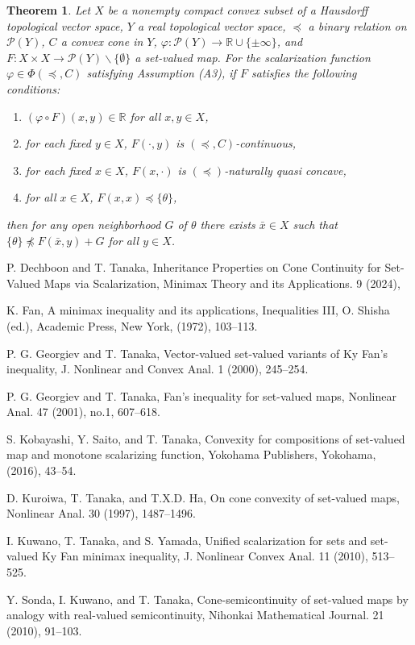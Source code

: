 \documentclass[a4paper,11pt]{jsarticle}
\newtheorem{thm}{Theorem}[section]
\theoremstyle{definition}
\newcommand{\RealNumberSet}{\mathbb{R}}
\begin{document}
\begin{thm}
  Let $X$ be a nonempty compact convex subset of a Hausdorff topological vector space,
  $Y$ a real topological vector space, $\preccurlyeq$ a binary relation on $\mathcal{P}(Y)$,
  $C$ a convex cone in $Y$, $\varphi\colon \mathcal{P}(Y) \to \RealNumberSet \cup \{\pm \infty\}$,
  and $F\colon X \times X \to \mathcal{P}(Y) \backslash \{\emptyset\}$ a set-valued map.
  For the scalarization function $\varphi \in \Phi(\preccurlyeq, C)$ satisfying Assumption (A3),
  if $F$ satisfies the following conditions:
  \begin{enumerate}
    \item $(\varphi \circ F)(x,y) \in \RealNumberSet$ for all $x,y \in X$,
    \item for each fixed $y \in X$, $F(\cdot,y)$ is $(\preccurlyeq, C)$-continuous,
    \item for each fixed $x \in X$, $F(x,\cdot)$ is $(\preccurlyeq)$-naturally quasi concave,
    \item for all $x \in X$, $F(x,x) \preccurlyeq \{\theta\}$,
  \end{enumerate}
  then for any open neighborhood $G$ of $\theta$ there exists $\bar{x} \in X$ such that
  $\{\theta\} \npreccurlyeq F(\bar{x},y) + G$ for all $y \in X$.
\end{thm}

\begin{thebibliography}{99}
  P. Dechboon and T. Tanaka, Inheritance Properties on Cone Continuity for Set-Valued Maps via Scalarization, Minimax Theory and its Applications. 9 (2024),

  K. Fan, A minimax inequality and its applications, Inequalities III, O. Shisha (ed.), Academic Press, New York, (1972), 103--113.

  P. G. Georgiev and T. Tanaka, Vector-valued set-valued variants of Ky Fan's inequality, J. Nonlinear and Convex Anal. 1 (2000), 245--254.

  P. G. Georgiev and T. Tanaka, Fan's inequality for set-valued maps, Nonlinear Anal. 47 (2001), no.1, 607--618.

  S. Kobayashi, Y. Saito, and T. Tanaka, Convexity for compositions of set-valued map and monotone scalarizing function, Yokohama Publishers, Yokohama, (2016), 43--54.

  D. Kuroiwa, T. Tanaka, and T.X.D. Ha, On cone convexity of set-valued maps, Nonlinear Anal. 30 (1997), 1487--1496.

  I. Kuwano, T. Tanaka, and S. Yamada, Unified scalarization for sets and set-valued Ky Fan minimax inequality, J. Nonlinear Convex Anal. 11 (2010), 513--525.

  Y. Sonda, I. Kuwano, and T. Tanaka, Cone-semicontinuity of set-valued maps by analogy with real-valued semicontinuity, Nihonkai Mathematical Journal. 21 (2010), 91--103.

\end{thebibliography}
\end{document}

